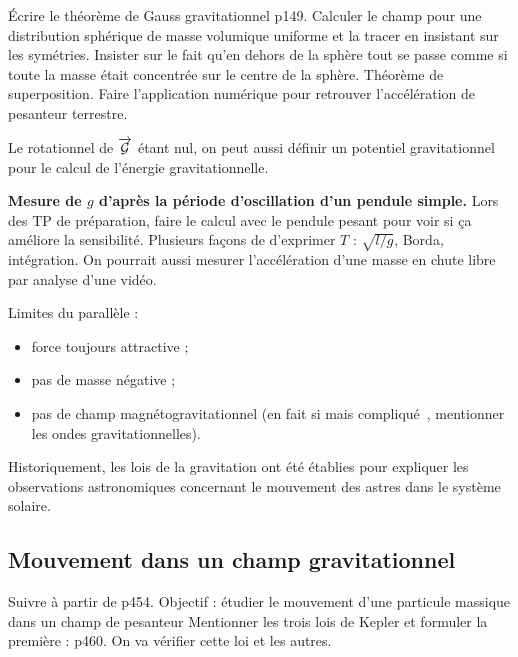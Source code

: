 Écrire le théorème de Gauss gravitationnel \cite{Faroux1996} p149.
Calculer le champ pour une distribution sphérique de masse volumique uniforme et la tracer en insistant sur les symétries.
Insister sur le fait qu'en dehors de la sphère tout se passe comme si toute la masse était concentrée sur le centre de la sphère.
Théorème de superposition.
Faire l'application numérique pour retrouver l'accélération de pesanteur terrestre.
\begin{remarque}
Le rotationnel de $\overrightarrow{\cal{G}}$ étant nul, on peut aussi définir un potentiel gravitationnel pour le calcul de l'énergie gravitationnelle.
\end{remarque}


\begin{experience}
\textbf{Mesure de $g$ d'après la période d'oscillation d'un pendule simple.}
Lors des TP de préparation, faire le calcul avec le pendule pesant pour voir si ça améliore la sensibilité.
Plusieurs façons de d'exprimer $T$ : $\sqrt{l/g}$, Borda, intégration.
On pourrait aussi mesurer l'accélération d'une masse en chute libre par analyse d'une vidéo.
\end{experience}

Limites du parallèle :
\begin{itemize}
\item force toujours attractive ;
\item pas de masse négative ;
\item pas de champ magnétogravitationnel (en fait si mais compliqué~\cite{Mashhoon2007}, mentionner les ondes gravitationnelles).
\end{itemize}

\begin{transition}
Historiquement, les lois de la gravitation ont été établies pour expliquer les observations astronomiques concernant le mouvement des astres dans le système solaire.
\end{transition}

\subsection{Mouvement dans un champ gravitationnel}

Suivre \cite{Michel2017} à partir de p454.
Objectif : étudier le mouvement d'une particule massique dans un champ de pesanteur
Mentionner les trois lois de Kepler et formuler la première : \cite{Michel2017} p460.
On va vérifier cette loi et les autres.

